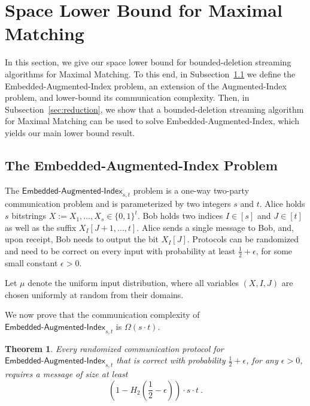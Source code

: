 \documentclass[11pt,a4paper]{article}
\newtheorem{theorem}{Theorem}
\begin{document}
\section{Space Lower Bound for \textsf{Maximal Matching}} \label{sec:lb}
In this section, we give our space lower bound for bounded-deletion streaming algorithms for \textsf{Maximal Matching}. To this end, in Subsection~\ref{sec:embedded-augmented-index} we define the \textsf{Embedded-Augmented-Index} problem, an extension of the \textsf{Augmented-Index} problem, and lower-bound its  communication complexity. Then, in Subsection~\ref{sec:reduction}, we show that a bounded-deletion streaming algorithm for \textsf{Maximal Matching} can be used to solve \textsf{Embedded-Augmented-Index}, which yields our main lower bound result.

\subsection{The \textsf{Embedded-Augmented-Index} Problem} \label{sec:embedded-augmented-index}
The $\textsf{Embedded-Augmented-Index}_{s,t}$ problem is a one-way two-party communication problem and is parameterized by two integers $s$ and $t$. Alice holds $s$ bitstrings $X := X_1, \dots, X_s \in \{0,1\}^{t}$. Bob holds two indices $I \in [s]$ and $J \in [t]$ as well as the suffix $X_I[J+1, \dots, t]$. Alice sends a single message to Bob, and, upon receipt, Bob needs to output the bit $X_I[J]$. Protocols can be randomized and need to be correct on every input with probability at least $\frac{1}{2} + \epsilon$, for some small constant $\epsilon > 0$.

Let $\mu$ denote the uniform input distribution, where all variables $(X, I, J)$ are chosen uniformly at random from their domains.

We now prove that the communication complexity of $\textsf{Embedded-Augmented-Index}_{s,t}$ is $\Omega(s \cdot t)$. 

\begin{theorem}\label{thm:embedded-aug-index}
    Every randomized communication protocol for $\textsf{Embedded-Augmented-Index}_{s,t}$ that is correct with probability $\frac{1}{2} + \epsilon$, for any $\epsilon > 0$, requires a message of size at least $$(1 - H_2(\frac{1}{2} - \epsilon)) \cdot s \cdot t \ .$$ 
\end{theorem}
\setcounter{counterEmbed}{\value{theorem}}
\end{document}
